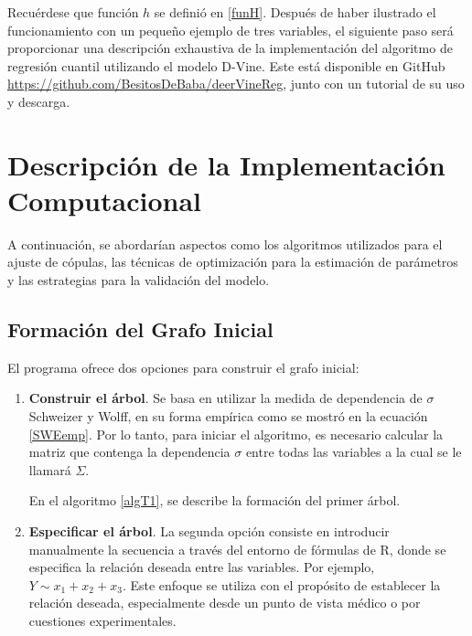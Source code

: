Recuérdese que función $h$ se definió en \eqref{funH}. Después de haber ilustrado el funcionamiento con un pequeño ejemplo de tres variables, el siguiente paso será proporcionar una descripción exhaustiva de la implementación del algoritmo de regresión cuantil utilizando el modelo D-Vine. Este está disponible en GitHub \url{https://github.com/BesitosDeBaba/deerVineReg}, junto con un tutorial de su uso y descarga.

\section{Descripción de la Implementación Computacional}

A continuación, se abordarían aspectos como los algoritmos utilizados para el ajuste de cópulas, las técnicas de optimización para la estimación de parámetros y las estrategias para la validación del modelo. 

\subsection{Formación del Grafo Inicial}

El programa ofrece dos opciones para construir el grafo inicial:

\begin{enumerate}
    \item \textbf{Construir el árbol}. Se basa en utilizar la medida de dependencia de $\sigma$ Schweizer y Wolff, en su forma empírica como se mostró en la ecuación \eqref{SWEemp}. Por lo tanto, para iniciar el algoritmo, es necesario calcular la matriz que contenga la dependencia $\sigma$ entre todas las variables a la cual se le llamará $\Sigma$.

    En el algoritmo \ref{algT1}, se describe la formación del primer árbol.

    \item \textbf{Especificar el árbol}. La segunda opción consiste en introducir manualmente la secuencia a través del entorno de fórmulas de R, donde se especifica la relación deseada entre las variables. Por ejemplo, $Y \sim x_1 + x_2 + x_3$. Este enfoque se utiliza con el propósito de establecer la relación deseada, especialmente desde un punto de vista médico o  por cuestiones experimentales.
\end{enumerate}


